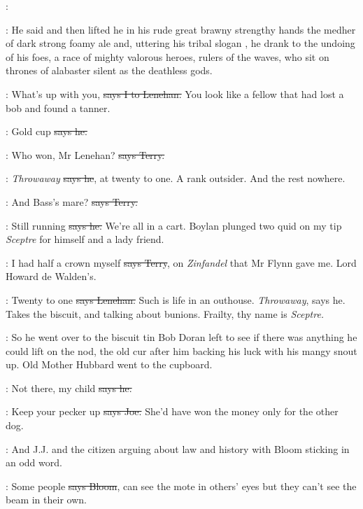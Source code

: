 \lenehan:

:
He said and then lifted he
in his rude great brawny strengthy hands
the medher of dark strong foamy ale and,
uttering his tribal slogan ,
he drank to the undoing of his foes,
a race of mighty valorous
heroes,
rulers of the waves,
who sit on thrones of alabaster silent as the
deathless gods.

:
What's up with you,
\sout{says I to Lenehan.}
You look like a fellow that had
lost a bob and found a tanner.

\lenehan:
Gold cup
\sout{says he.}

\terry:
Who won,
Mr Lenehan?
\sout{says Terry.}

\lenehan:
\emph{Throwaway}
\sout{says he},
at twenty to one.
A rank outsider.
And the rest
nowhere.%

\terry:
And Bass's mare?
\sout{says Terry.}

\lenehan:
Still running
\sout{says he.}
We're all in a cart.
Boylan plunged two quid on
my tip \emph{Sceptre} for himself and a lady friend.

\terry:
I had half a crown myself
\sout{says Terry},
on \emph{Zinfandel} that Mr Flynn gave
me.
Lord Howard de Walden's.

\lenehan:
Twenty to one
\sout{says Lenehan.}
Such is life in an outhouse.
\emph{Throwaway},
says he.
Takes the biscuit,
and talking about bunions.
Frailty,
thy name
is \emph{Sceptre.}

\Nq:
So he went over to the biscuit tin Bob Doran left to see if there was
anything he could lift on the nod,
the old cur after him backing his luck
with his mangy snout up.
Old Mother Hubbard went to the cupboard.

\lenehan:
Not there,
my child
\sout{says he.}

\joe:
Keep your pecker up
\sout{says Joe.}
She'd have won the money only for the
other dog.

\Nq:
And J.J.
and the citizen arguing about law and history with Bloom
sticking in an odd word.

\Bloom:
Some people
\sout{says Bloom},
can see the mote in others' eyes but they can't
see the beam in their own.

